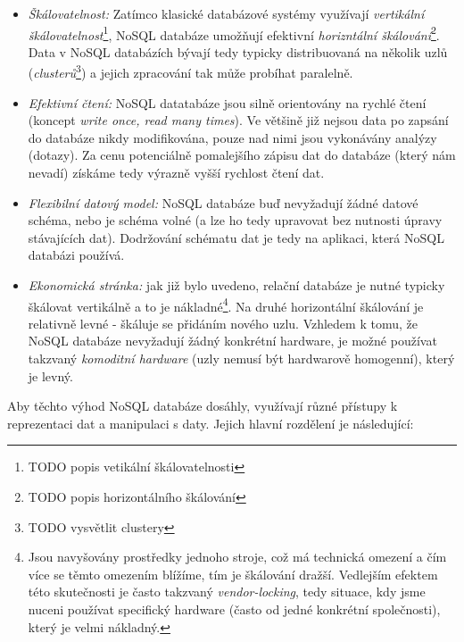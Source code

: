 \begin{itemize}
  \item{\textit{Škálovatelnost:}} Zatímco klasické databázové systémy využívají \textit{vertikální škálovatelnost}\footnote{TODO popis vetikální škálovatelnosti}, NoSQL databáze umožňují efektivní \textit{horizntální škálování}\footnote{TODO popis horizontálního škálování}. Data v NoSQL databázích bývají tedy typicky distribuovaná na několik uzlů (\textit{clusterů}\footnote{TODO vysvětlit clustery}) a jejich zpracování tak může probíhat paralelně. 
  \item{\textit{Efektivní čtení:}} NoSQL datatabáze jsou silně orientovány na rychlé čtení (koncept \textit{write once, read many times}). Ve většině již nejsou data po zapsání do databáze nikdy modifikována, pouze nad nimi jsou vykonávány analýzy (dotazy). Za cenu potenciálně pomalejšího zápisu dat do databáze (který nám nevadí) získáme tedy výrazně vyšší rychlost čtení dat.  
  \item{\textit{Flexibilní datový model:}} NoSQL databáze buď nevyžadují žádné datové schéma, nebo je schéma volné (a lze ho tedy upravovat bez nutnosti úpravy stávajících dat). Dodržování schématu dat je tedy na aplikaci, která NoSQL databázi používá.  
  \item{\textit{Ekonomická stránka:}} jak již bylo uvedeno, relační databáze je nutné typicky škálovat vertikálně a to je nákladné\footnote{Jsou navyšovány prostředky jednoho stroje, což má technická omezení a čím více se těmto omezením blížíme, tím je škálování dražší. Vedlejším efektem této skutečnosti je často takzvaný \textit{vendor-locking}, tedy situace, kdy jsme nuceni používat specifický hardware (často od jedné konkrétní společnosti), který je velmi nákladný.}. Na druhé horizontální škálování je relativně levné - škáluje se přidáním nového uzlu. Vzhledem k tomu, že NoSQL databáze nevyžadují žádný konkrétní hardware, je možné používat takzvaný \textit{komoditní hardware} (uzly nemusí být hardwarově homogenní), který je levný.  
\end{itemize}

Aby těchto výhod NoSQL databáze dosáhly, využívají různé přístupy k reprezentaci dat a manipulaci s daty. Jejich hlavní rozdělení je následující: 


